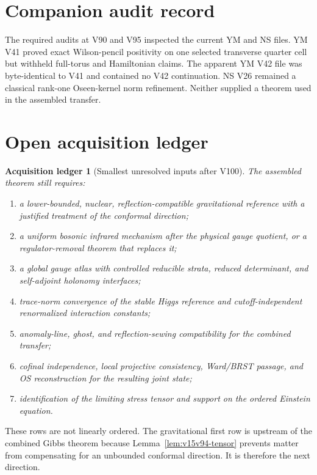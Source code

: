 \documentclass[11pt]{article}
\newtheorem{ledger}[theorem]{Acquisition ledger}
\theoremstyle{remark}
\begin{document}
\section{Companion audit record}

The required audits at V90 and V95 inspected the current YM and NS
files.  YM V41 proved exact Wilson-pencil positivity on one selected
transverse quarter cell but withheld full-torus and Hamiltonian
claims.  The apparent YM V42 file was byte-identical to V41 and
contained no V42 continuation.  NS V26 remained a classical
rank-one Oseen-kernel norm refinement.  Neither supplied a theorem
used in the assembled transfer.

\section{Open acquisition ledger}

\begin{ledger}[Smallest unresolved inputs after V100]
\label{led:v15v100-open}
The assembled theorem still requires:
\begin{enumerate}
\item a lower-bounded, nuclear, reflection-compatible gravitational
      reference with a justified treatment of the conformal
      direction;
\item a uniform bosonic infrared mechanism after the physical gauge
      quotient, or a regulator-removal theorem that replaces it;
\item a global gauge atlas with controlled reducible strata,
      reduced determinant, and self-adjoint holonomy interfaces;
\item trace-norm convergence of the stable Higgs reference and
      cutoff-independent renormalized interaction constants;
\item anomaly-line, ghost, and reflection-sewing compatibility for
      the combined transfer;
\item cofinal independence, local projective consistency, Ward/BRST
      passage, and OS reconstruction for the resulting joint state;
\item identification of the limiting stress tensor and support on
      the ordered Einstein equation.
\end{enumerate}
\end{ledger}

These rows are not linearly ordered.  The gravitational first row
is upstream of the combined Gibbs theorem because
Lemma~\ref{lem:v15v94-tensor} prevents matter from compensating for
an unbounded conformal direction.  It is therefore the next
direction.
\end{document}
